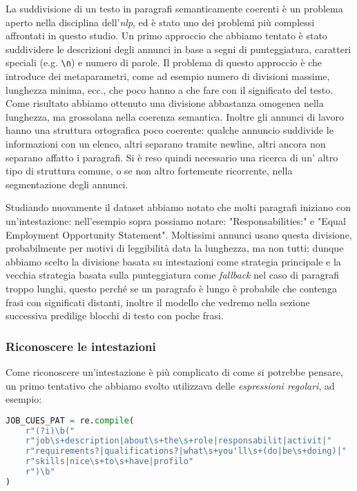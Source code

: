 \noindent La suddivisione di un testo in paragrafi semanticamente coerenti è un problema aperto nella disciplina dell'\textit{nlp}, ed è stato uno dei problemi più complessi affrontati in questo studio. Un primo approccio che abbiamo tentato è stato suddividere le descrizioni degli annunci in base a segni di punteggiatura, caratteri speciali (e.g. \texttt{\textbackslash n}) e numero di parole. Il problema di questo approccio è che introduce dei metaparametri, come ad esempio numero di divisioni massime, lunghezza minima, ecc., che poco hanno a che fare con il significato del testo. Come risultato abbiamo ottenuto una divisione abbastanza omogenea nella lunghezza, ma grossolana nella coerenza semantica. Inoltre gli annunci di lavoro hanno una struttura ortografica poco coerente: qualche annuncio suddivide le informazioni con un elenco, altri separano tramite newline, altri ancora non separano affatto i paragrafi. Si è reso quindi necessario una ricerca di un' altro tipo di struttura comune, o se non altro fortemente ricorrente, nella segmentazione degli annunci.

\medskip

\noindent Studiando nuovamente il dataset abbiamo notato che molti paragrafi iniziano con un'intestazione: nell'esempio sopra possiamo notare: "Responsabilities:" e "Equal Employment Opportunity Statement". Moltissimi annunci usano questa divisione, probabilmente  per motivi di leggibilità data la lunghezza, ma non tutti; dunque abbiamo scelto la divisione basata su intestazioni come strategia principale e la vecchia strategia basata sulla punteggiatura come \textit{fallback} nel caso di paragrafi troppo lunghi, questo perché se un paragrafo è lungo è probabile che contenga frasi con significati distanti, inoltre il modello che vedremo nella sezione successiva predilige blocchi di testo con poche frasi.

\medskip
\subsubsection{Riconoscere le intestazioni}
\noindent Come riconoscere un'intestazione è più complicato di come si potrebbe pensare, un primo tentativo che abbiamo svolto utilizzava delle \textit{espressioni regolari}, ad esempio:

\begin{lstlisting}[language=python]
JOB_CUES_PAT = re.compile(
    r"(?i)\b("
    r"job\s+description|about\s+the\s+role|responsabilit|activit|"
    r"requirements?|qualifications?|what\s+you'll\s+(do|be\s+doing)|"
    r"skills|nice\s+to\s+have|profilo"
    r")\b"
)
\end{lstlisting}

